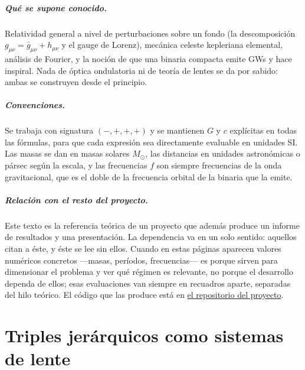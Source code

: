 \documentclass[11pt,a4paper,openany]{book}
\newcommand{\Msun}{M_{\odot}}
\newcommand{\repourl}{https://github.com/fausto-bottazzini/Gravitational-Lensing-of-GWs}
\begin{document}
\paragraph{Qu\'e se supone conocido.} Relatividad general a nivel de
perturbaciones sobre un fondo (la descomposici\'on
$g_{\mu\nu}=\bar g_{\mu\nu}+h_{\mu\nu}$ y el gauge de Lorenz), mec\'anica
celeste kepleriana elemental, an\'alisis de Fourier, y la noci\'on de que una
binaria compacta emite GWs y hace inspiral. Nada de \'optica ondulatoria ni
de teor\'ia de lentes se da por sabido: ambas se construyen desde el
principio.

\paragraph{Convenciones.} Se trabaja con signatura $(-,+,+,+)$ y se mantienen
$G$ y $c$ expl\'icitas en todas las f\'ormulas, para
que cada expresi\'on sea directamente evaluable en unidades SI. Las masas se
dan en masas solares $\Msun$, las distancias en unidades astron\'omicas o
p\'arsec seg\'un la escala, y las frecuencias $f$ son siempre frecuencias de
la onda gravitacional, que es el doble de la frecuencia orbital de la
binaria que la emite.

\paragraph{Relaci\'on con el resto del proyecto.} Este texto es la referencia
te\'orica de un proyecto que adem\'as produce un informe de resultados y una
presentaci\'on. La dependencia va en un solo sentido: aquellos citan a
\'este, y \'este se lee sin ellos. Cuando en estas p\'aginas aparecen valores
num\'ericos concretos ---masas, per\'iodos, frecuencias--- es porque sirven
para dimensionar el problema y ver qu\'e r\'egimen es relevante, no porque el
desarrollo dependa de ellos; esas evaluaciones van siempre en recuadros
aparte, separadas del hilo te\'orico. El c\'odigo que las produce est\'a en
\href{\repourl}{el repositorio del proyecto}.

\tableofcontents

\chapter{Triples jer\'arquicos como sistemas de lente}
\label{ch:scope}
\end{document}
